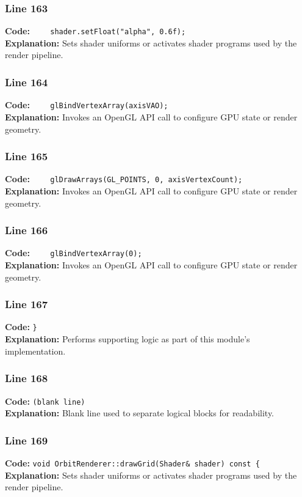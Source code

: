 \documentclass[11pt,a4paper]{article}
\begin{document}
\subsubsection*{Line 163}
\textbf{Code:} \verb|    shader.setFloat("alpha", 0.6f);|\\
\textbf{Explanation:} Sets shader uniforms or activates shader programs used by the render pipeline.

\subsubsection*{Line 164}
\textbf{Code:} \verb|    glBindVertexArray(axisVAO);|\\
\textbf{Explanation:} Invokes an OpenGL API call to configure GPU state or render geometry.

\subsubsection*{Line 165}
\textbf{Code:} \verb|    glDrawArrays(GL_POINTS, 0, axisVertexCount);|\\
\textbf{Explanation:} Invokes an OpenGL API call to configure GPU state or render geometry.

\subsubsection*{Line 166}
\textbf{Code:} \verb|    glBindVertexArray(0);|\\
\textbf{Explanation:} Invokes an OpenGL API call to configure GPU state or render geometry.

\subsubsection*{Line 167}
\textbf{Code:} \verb|}|\\
\textbf{Explanation:} Performs supporting logic as part of this module's implementation.

\subsubsection*{Line 168}
\textbf{Code:} \texttt{(blank line)}\\
\textbf{Explanation:} Blank line used to separate logical blocks for readability.

\subsubsection*{Line 169}
\textbf{Code:} \verb|void OrbitRenderer::drawGrid(Shader& shader) const {|\\
\textbf{Explanation:} Sets shader uniforms or activates shader programs used by the render pipeline.
\end{document}
